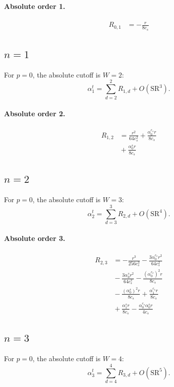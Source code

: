 \documentclass[10pt]{article}
\begin{document}
\paragraph{Absolute order 1.}
\begin{align*}
R_{0,1} &=  - \frac{r}{8 c_{s}}
\end{align*}

\subsection{$n=1$}
For $p=0$, the absolute cutoff is $W=2$:
\[\alpha_{1}^t=\sum_{d=2}^{2}R_{1,d}+O(\mathrm{SR}^{3}).\]
\paragraph{Absolute order 2.}
\begin{align*}
R_{1,2} &= \frac{r^{2}}{64 c_{s}^{2}} + \frac{\alpha_{0}^{c_s} r}{8 c_{s}} \\
&{}  + \frac{\alpha_{0}^s r}{8 c_{s}}
\end{align*}

\subsection{$n=2$}
For $p=0$, the absolute cutoff is $W=3$:
\[\alpha_{2}^t=\sum_{d=3}^{3}R_{2,d}+O(\mathrm{SR}^{4}).\]
\paragraph{Absolute order 3.}
\begin{align*}
R_{2,3} &=  - \frac{r^{3}}{256 c_{s}^{3}} - \frac{3 \alpha_{0}^{c_s} r^{2}}{64 c_{s}^{2}} \\
&{}  - \frac{3 \alpha_{0}^s r^{2}}{64 c_{s}^{2}} - \frac{\left(\alpha_{0}^{c_s}\right)^{2} r}{8 c_{s}} \\
&{}  - \frac{\left(\alpha_{0}^s\right)^{2} r}{8 c_{s}} + \frac{\alpha_{1}^{c_s} r}{8 c_{s}} \\
&{}  + \frac{\alpha_{1}^s r}{8 c_{s}} - \frac{\alpha_{0}^{c_s} \alpha_{0}^s r}{4 c_{s}}
\end{align*}

\subsection{$n=3$}
For $p=0$, the absolute cutoff is $W=4$:
\[\alpha_{3}^t=\sum_{d=4}^{4}R_{3,d}+O(\mathrm{SR}^{5}).\]
\end{document}
